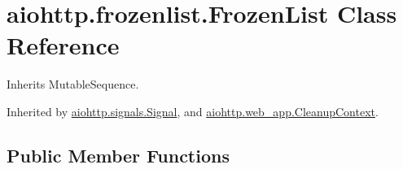 \hypertarget{classaiohttp_1_1frozenlist_1_1_frozen_list}{}\section{aiohttp.\+frozenlist.\+Frozen\+List Class Reference}
\label{classaiohttp_1_1frozenlist_1_1_frozen_list}


Inherits Mutable\+Sequence.



Inherited by \hyperlink{classaiohttp_1_1signals_1_1_signal}{aiohttp.\+signals.\+Signal}, and \hyperlink{classaiohttp_1_1web__app_1_1_cleanup_context}{aiohttp.\+web\+\_\+app.\+Cleanup\+Context}.

\subsection*{Public Member Functions}
